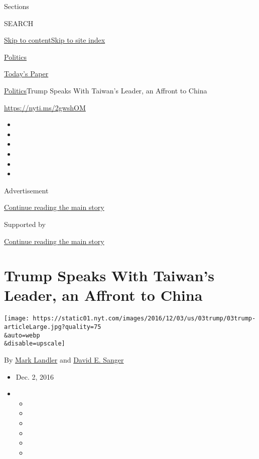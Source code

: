Sections

SEARCH

\protect\hyperlink{site-content}{Skip to
content}\protect\hyperlink{site-index}{Skip to site index}

\href{https://www.nytimes.com/section/politics}{Politics}

\href{https://myaccount.nytimes.com/auth/login?response_type=cookie\&client_id=vi}{}

\href{https://www.nytimes.com/section/todayspaper}{Today's Paper}

\href{/section/politics}{Politics}\textbar{}Trump Speaks With Taiwan's
Leader, an Affront to China

\url{https://nyti.ms/2gwshOM}

\begin{itemize}
\item
\item
\item
\item
\item
\item
\end{itemize}

Advertisement

\protect\hyperlink{after-top}{Continue reading the main story}

Supported by

\protect\hyperlink{after-sponsor}{Continue reading the main story}

\hypertarget{trump-speaks-with-taiwans-leader-an-affront-to-china}{%
\section{Trump Speaks With Taiwan's Leader, an Affront to
China}\label{trump-speaks-with-taiwans-leader-an-affront-to-china}}

\texttt{[image: https://static01.nyt.com/images/2016/12/03/us/03trump/03trump-articleLarge.jpg?quality=75\\\&auto=webp\\\&disable=upscale]}

By \href{http://www.nytimes.com/by/mark-landler}{Mark Landler} and
\href{http://www.nytimes.com/by/david-e-sanger}{David E. Sanger}

\begin{itemize}
\item
  Dec. 2, 2016
\item
  \begin{itemize}
  \item
  \item
  \item
  \item
  \item
  \item
  \end{itemize}
\end{itemize}

